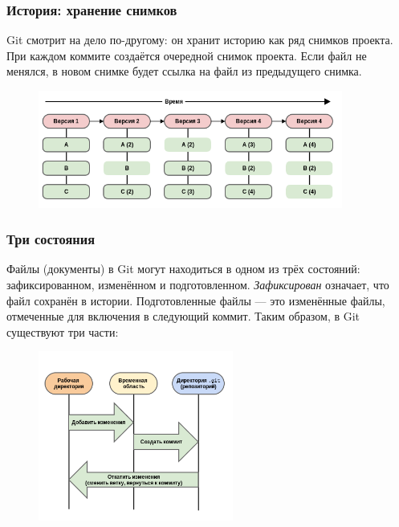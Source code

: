 \documentclass{beamer}
\begin{document}
\begin{frame}
  \frametitle{История: хранение снимков}
  Git смотрит на дело по-другому: он хранит историю как ряд снимков проекта.
  При каждом коммите создаётся очередной снимок
  проекта. Если файл не менялся, в новом снимке будет ссылка на файл из предыдущего
  снимка.

  \begin{figure}
     \includegraphics[width=10cm]{images/history-snapshots.png}
  \end{figure}
\end{frame}

\begin{frame}
  \frametitle{Три состояния}
  Файлы (документы) в Git могут находиться в одном из трёх состояний: зафиксированном,
  изменённом и подготовленном. {\it Зафиксирован} означает, что файл сохранён в истории.
  Подготовленные файлы --- это изменённые файлы, отмеченные для включения в следующий
  коммит. Таким образом, в Git существуют три части:

  \begin{figure}
     \includegraphics[width=6.4cm]{images/git-sections.png}
  \end{figure}
\end{frame}
\end{document}
